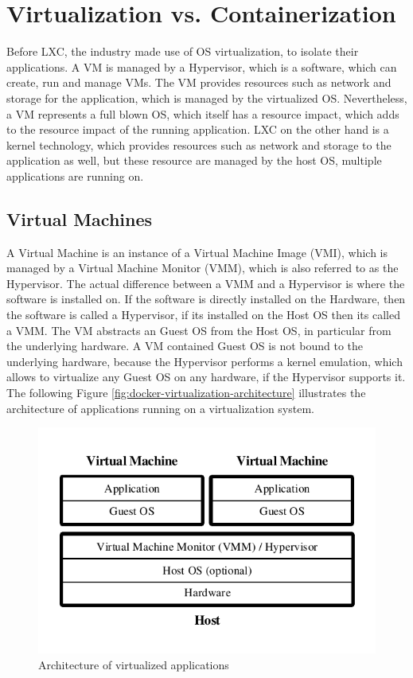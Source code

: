 \section{Virtualization vs. Containerization}
\label{sec:docker-virtualization-vs-containerization}
Before LXC, the industry made use of OS virtualization, to isolate their applications. A VM is managed by a Hypervisor, which is a software, which can create, run and manage VMs. The VM provides resources such as network and storage for the application, which is managed by the virtualized OS. Nevertheless, a VM represents a full blown OS, which itself has a resource impact, which adds to the resource impact of the running application. LXC on the other hand is a kernel technology, which provides resources such as network and storage to the application as well, but these resource are managed by the host OS, multiple applications are running on.

\subsection{Virtual Machines}
\label{sec:docker-virtual-machines}
A Virtual Machine is an instance of a Virtual Machine Image (VMI), which is managed by a Virtual Machine Monitor (VMM), which is also referred to as the Hypervisor. The actual difference between a VMM and a Hypervisor is where the software is installed on. If the software is directly installed on the Hardware, then the software is called a Hypervisor, if its installed on the Host OS then its called a VMM. The VM abstracts  an Guest OS from the Host OS, in particular from the underlying hardware. A VM contained Guest OS is not bound to the underlying hardware, because the Hypervisor performs a kernel emulation, which allows to virtualize any Guest OS on any hardware, if the Hypervisor supports it. The following Figure \vref{fig:docker-virtualization-architecture} illustrates the architecture of applications running on a virtualization system.

\begin{figure}[htbp]
	\centering
	\includegraphics[scale=1]{images/docker-virtualization-architecture.pdf}
	\caption{Architecture of virtualized applications}
	\label{fig:docker-virtualization-architecture}
\end{figure} 

